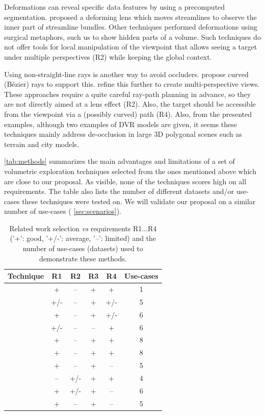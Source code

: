 Deformations can reveal specific data features by using a precomputed segmentation. \cite{7332955} proposed a deforming lens which moves streamlines to observe the inner part of streamline bundles. Other techniques performed deformations using surgical metaphors, such us \cite{4069230,Correa:2006:FAV:1187627.1187827} to show hidden parts of a volume. Such techniques do not offer tools for local manipulation of the viewpoint that allows seeing a target under multiple perspectives (R2) while keeping the global context. 

Using non-straight-line rays is another way to avoid occluders. \cite{5613463} propose curved (B{\'e}zier) rays to support this.  \cite{7120994} refine this further to create multi-perspective views. These approaches require a quite careful ray-path planning in advance, so they are not directly aimed at a lens effect (R2). Also, the target should be accessible from the viewpoint via a (possibly curved) path (R4). Also, from the presented examples, although two examples of DVR models are given, it seems these techniques mainly address de-occlusion in large 3D polygonal scenes such as terrain and city models.

\autoref{tab:methods} summarizes the main advantages and limitations of a set of volumetric exploration techniques selected from the ones mentioned above which are close to our proposal. As visible, none of the techniques scores high on all requirements. The table also lists the number of different datasets and/or use-cases these techniques were tested on. We will validate our proposal on a similar number of use-cases ( \autoref{sec:scenarios}).
\begin{table}
\centering
\small
\begin{tabular}{ |c|c|c|c|c|c| }
\hline
\textbf{Technique} & \textbf{R1} & \textbf{R2} & \textbf{R3} & \textbf{R4} & \textbf{Use-cases}\\
\hline
\hline
\cite{1250400} & + & -- & + & + & 1\\
\cite{Sonnet:2004:IEA:989863.989871} & +/- & -- & + & +/- & 5\\
\cite{1532818} & + & -- & + & +/- & 6\\
\cite{4015467} & +/- & -- & -- & + & 6\\
\cite{Correa:2006:FAV:1187627.1187827} & + & -- & + & + & 8\\
\cite{Correa:2007:IDD:1313046.1313163} & + & -- & + & + & 8\\
\cite{5613463} & + & -- & + & -- & 5\\
\cite{Hsu:2011:RFM:2070781.2024165} & -- & +/- & + & + & 4\\
\cite{6787171} & + & +/- & + & -- & 6\\
\cite{7120994} & + & -- & + & -- & 5\\
\hline
\end{tabular}
\caption{Related work selection \emph{vs} requirements R1...R4 ('+': good, '+/-': average, '--': limited) and the number of use-cases (datasets) used to demonstrate these methods.}
\label{tab:methods}
\end{table}
